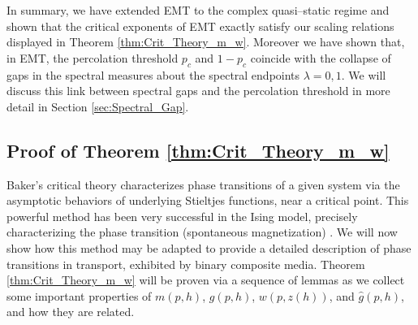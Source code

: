 \documentclass[english,12pt,jmp,graphicx]{revtex4-1}
\newtheorem{definition}{Definition}[section]
\newcommand{\ph}{\hat{\phi}}
\begin{document}
In summary, we have extended EMT to the complex quasi--static regime
and shown that the critical exponents of EMT exactly satisfy our
scaling relations displayed in Theorem
\ref{thm:Crit_Theory_m_w}. Moreover we have shown that, in EMT, the
percolation threshold $p_c$ and $1-p_c$ coincide with the collapse of
gaps in the spectral measures about the spectral endpoints $\lambda=0,1$. We  
will discuss this link between spectral gaps and the percolation
threshold in more detail in Section \ref{sec:Spectral_Gap}.
%
\subsection{Proof of Theorem
  \ref{thm:Crit_Theory_m_w}} \label{sec:Proof_of_Theorem}
%
Baker's critical theory characterizes phase transitions of a given system
via the asymptotic behaviors of underlying Stieltjes functions, near a
critical point. This powerful method has been very successful in the
Ising model, precisely characterizing the phase transition
(spontaneous magnetization) \cite{Baker-1990}.
We will now show how this method may be adapted to provide a detailed
description of phase transitions in transport, exhibited by binary
composite media. Theorem \ref{thm:Crit_Theory_m_w} will be proven via
a sequence of lemmas as we collect some important properties of
$m(p,h)$, $g(p,h)$, $w(p,z(h))$, and $\hat{g}(p,h)$, and how they are related.   
%
\end{document}
